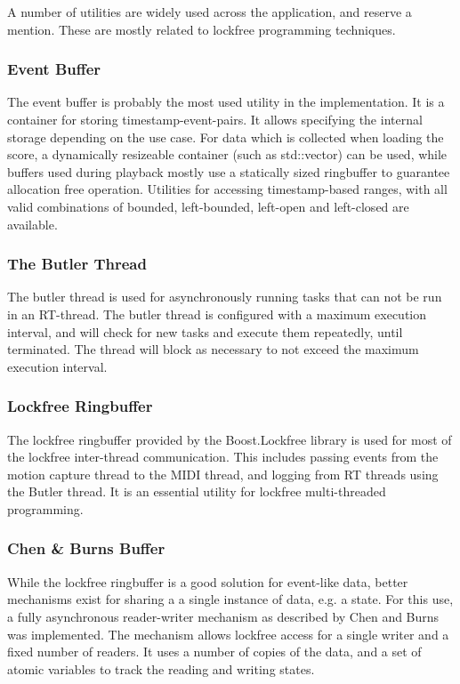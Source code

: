 A number of utilities are widely used across the application,
and reserve a mention.
These are mostly related to lockfree programming techniques.

\subsubsection*{Event Buffer}

The event buffer is probably the most used utility in the implementation.
It is a container for storing timestamp-event-pairs.
It allows specifying the internal storage depending on the use case.
For data which is collected when loading the score,
a dynamically resizeable container (such as std::vector) can be used,
while buffers used during playback mostly use a statically sized ringbuffer
to guarantee allocation free operation.
Utilities for accessing timestamp-based ranges,
with all valid combinations of
bounded, left-bounded, left-open and left-closed are available.

\subsubsection*{The Butler Thread}

The butler thread is used for asynchronously running
tasks that can not be run in an RT-thread.
The butler thread is configured with a maximum execution interval,
and will check for new tasks and execute them repeatedly,
until terminated.
The thread will block as necessary to not exceed the
maximum execution interval.

\subsubsection*{Lockfree Ringbuffer}

The lockfree ringbuffer provided by the Boost.Lockfree library \cite{required?}
is used for most of the lockfree inter-thread communication.
This includes passing events from the motion capture thread
to the MIDI thread, and logging from RT threads using the Butler thread.
It is an essential utility for lockfree multi-threaded programming.

\subsubsection*{Chen \& Burns Buffer}

While the lockfree ringbuffer is a good solution
for event-like data,
better mechanisms exist for sharing a a single
instance of data, e.g. a state. 
For this use, a fully asynchronous reader-writer mechanism
as described by Chen and Burns \cite{Chen97} was implemented.
The mechanism allows lockfree access for
a single writer and a fixed number of readers.
It uses a number of copies of the data,
and a set of atomic variables to track
the reading and writing states.


